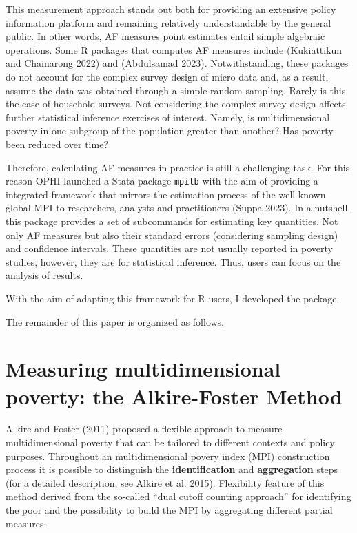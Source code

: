 This measurement approach stands out both for providing an extensive policy information platform and remaining relatively understandable by the general public. In other words, AF measures point estimates entail simple algebraic operations. Some R packages that computes AF measures include  (Kukiattikun and Chainarong 2022) and  (Abdulsamad 2023). Notwithstanding, these packages do not account for the complex survey design of micro data and, as a result, assume the data was obtained through a simple random sampling. Rarely is this the case of household surveys. Not considering the complex survey design affects further statistical inference exercises of interest. Namely, is multidimensional poverty in one subgroup of the population greater than another? Has poverty been reduced over time?

Therefore, calculating AF measures in practice is still a challenging task. For this reason OPHI launched a Stata package \texttt{mpitb} with the aim of providing a integrated framework that mirrors the estimation process of the well-known global MPI to researchers, analysts and practitioners (Suppa 2023). In a nutshell, this package provides a set of subcommands for estimating key quantities. Not only AF measures but also their standard errors (considering sampling design) and confidence intervals. These quantities are not usually reported in poverty studies, however, they are for statistical inference. Thus, users can focus on the analysis of results.

With the aim of adapting this framework for R users, I developed the  package.

The remainder of this paper is organized as follows.

\hypertarget{measuring-multidimensional-poverty-the-alkire-foster-method}{%
\section{Measuring multidimensional poverty: the Alkire-Foster Method}\label{measuring-multidimensional-poverty-the-alkire-foster-method}}

Alkire and Foster (2011) proposed a flexible approach to measure multidimensional poverty that can be tailored to different contexts and policy purposes. Throughout an multidimensional povery index (MPI) construction process it is possible to distinguish the \textbf{identification} and \textbf{aggregation} steps (for a detailed description, see Alkire et al. 2015). Flexibility feature of this method derived from the so-called ``dual cutoff counting approach'' for identifying the poor and the possibility to build the MPI by aggregating different partial measures.

